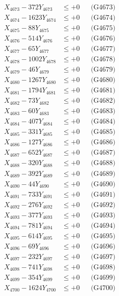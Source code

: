 \documentclass[a4paper,10pt]{article}
\begin{document}
{\begin{align}
X_{4673} - 372Y_{4673} &\leq +0 && \text{(G4673)} \\
X_{4674} - 1623Y_{4674} &\leq +0 && \text{(G4674)} \\
X_{4675} - 88Y_{4675} &\leq +0 && \text{(G4675)} \\
X_{4676} - 514Y_{4676} &\leq +0 && \text{(G4676)} \\
X_{4677} - 65Y_{4677} &\leq +0 && \text{(G4677)} \\
X_{4678} - 1002Y_{4678} &\leq +0 && \text{(G4678)} \\
X_{4679} - 46Y_{4679} &\leq +0 && \text{(G4679)} \\
X_{4680} - 1267Y_{4680} &\leq +0 && \text{(G4680)} \\
\allowbreak
X_{4681} - 1794Y_{4681} &\leq +0 && \text{(G4681)} \\
X_{4682} - 73Y_{4682} &\leq +0 && \text{(G4682)} \\
X_{4683} - 60Y_{4683} &\leq +0 && \text{(G4683)} \\
X_{4684} - 407Y_{4684} &\leq +0 && \text{(G4684)} \\
X_{4685} - 331Y_{4685} &\leq +0 && \text{(G4685)} \\
X_{4686} - 127Y_{4686} &\leq +0 && \text{(G4686)} \\
X_{4687} - 652Y_{4687} &\leq +0 && \text{(G4687)} \\
X_{4688} - 320Y_{4688} &\leq +0 && \text{(G4688)} \\
X_{4689} - 392Y_{4689} &\leq +0 && \text{(G4689)} \\
X_{4690} - 44Y_{4690} &\leq +0 && \text{(G4690)} \\
\allowbreak
X_{4691} - 733Y_{4691} &\leq +0 && \text{(G4691)} \\
X_{4692} - 276Y_{4692} &\leq +0 && \text{(G4692)} \\
X_{4693} - 377Y_{4693} &\leq +0 && \text{(G4693)} \\
X_{4694} - 781Y_{4694} &\leq +0 && \text{(G4694)} \\
X_{4695} - 614Y_{4695} &\leq +0 && \text{(G4695)} \\
X_{4696} - 69Y_{4696} &\leq +0 && \text{(G4696)} \\
X_{4697} - 232Y_{4697} &\leq +0 && \text{(G4697)} \\
X_{4698} - 741Y_{4698} &\leq +0 && \text{(G4698)} \\
X_{4699} - 354Y_{4699} &\leq +0 && \text{(G4699)} \\
X_{4700} - 1624Y_{4700} &\leq +0 && \text{(G4700)} \\

\end{align}}
\end{document}
